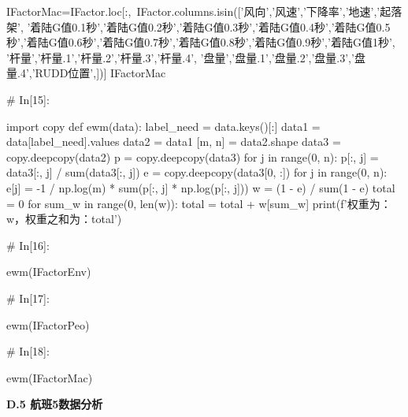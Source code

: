 \documentclass{MathorCupModeling}
\begin{document}
\begin{python}
IFactorMac=IFactor.loc[:,~IFactor.columns.isin(['风向','风速','下降率','地速','起落架',
                          '着陆G值0.1秒','着陆G值0.2秒','着陆G值0.3秒','着陆G值0.4秒','着陆G值0.5秒','着陆G值0.6秒','着陆G值0.7秒','着陆G值0.8秒','着陆G值0.9秒','着陆G值1秒',
                          '杆量','杆量.1','杆量.2','杆量.3','杆量.4',
                          '盘量','盘量.1','盘量.2','盘量.3','盘量.4','RUDD位置',])]
IFactorMac


# In[15]:


import copy
def ewm(data):
    label_need = data.keys()[:]
    data1 = data[label_need].values
    data2 = data1
    [m, n] = data2.shape
    data3 = copy.deepcopy(data2)
    p = copy.deepcopy(data3)
    for j in range(0, n):
        p[:, j] = data3[:, j] / sum(data3[:, j])
    e = copy.deepcopy(data3[0, :])
    for j in range(0, n):
        e[j] = -1 / np.log(m) * sum(p[:, j] * np.log(p[:, j]))
    w = (1 - e) / sum(1 - e)
    total = 0
    for sum_w in range(0, len(w)):
        total = total + w[sum_w]
    print(f'权重为：{w}，权重之和为：{total}')


# In[16]:


ewm(IFactorEnv)


# In[17]:


ewm(IFactorPeo)


# In[18]:


ewm(IFactorMac)


\end{python}
\newpage
\textbf{D.5 航班5数据分析}
\end{document}
